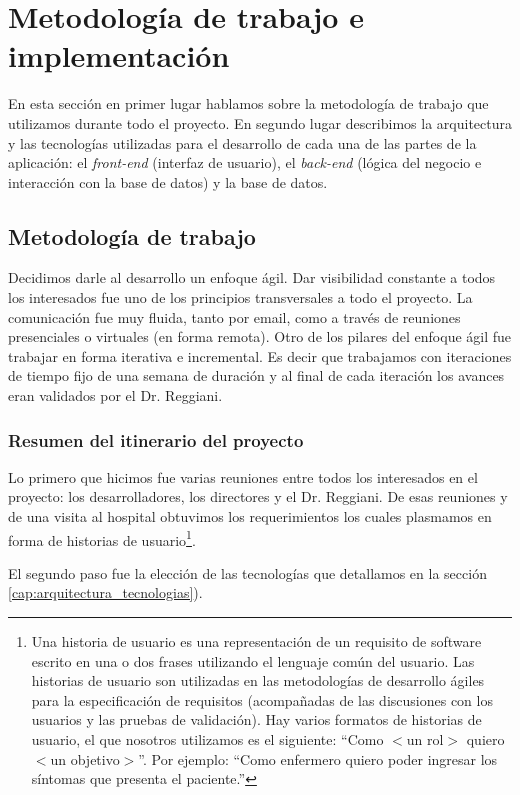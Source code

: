 \section{Metodología de trabajo e implementación}
En esta sección en primer lugar hablamos sobre la metodología de trabajo que utilizamos durante todo el proyecto. En segundo lugar describimos la arquitectura y las tecnologías utilizadas para el desarrollo de cada una de las partes de la aplicación: el \textit{front-end} (interfaz de usuario), el \textit{back-end} (lógica del negocio e interacción con la base de datos) y la base de datos.

\subsection{Metodología de trabajo}
Decidimos darle al desarrollo un enfoque ágil\cite{Shore}. Dar visibilidad constante a todos los interesados fue uno de los principios transversales a todo el proyecto. La comunicación fue muy fluida, tanto por email, como a través de reuniones presenciales o virtuales (en forma remota). Otro de los pilares del enfoque ágil fue trabajar en forma iterativa e incremental. Es decir que trabajamos con iteraciones de tiempo fijo de una semana de duración y al final de cada iteración los avances eran validados por el Dr. Reggiani.

\subsubsection{Resumen del itinerario del proyecto}\label{cap:itinerario}
Lo primero que hicimos fue varias reuniones entre todos los interesados en el proyecto: los desarrolladores, los directores y el Dr. Reggiani. De esas reuniones y de una visita al hospital obtuvimos los requerimientos los cuales plasmamos en forma de historias de usuario\footnote{Una historia de usuario es una representación de un requisito de software escrito en una o dos frases utilizando el lenguaje común del usuario. Las historias de usuario son utilizadas en las metodologías de desarrollo ágiles para la especificación de requisitos (acompañadas de las discusiones con los usuarios y las pruebas de validación). Hay varios formatos de historias de usuario, el que nosotros utilizamos es el siguiente: ``Como  $<$un rol$>$ quiero $<$un objetivo$>$''. Por ejemplo: ``Como enfermero quiero poder ingresar los síntomas que presenta el paciente.''}.

El segundo paso fue la elección de las tecnologías que detallamos en la sección \ref{cap:arquitectura_tecnologias}).

